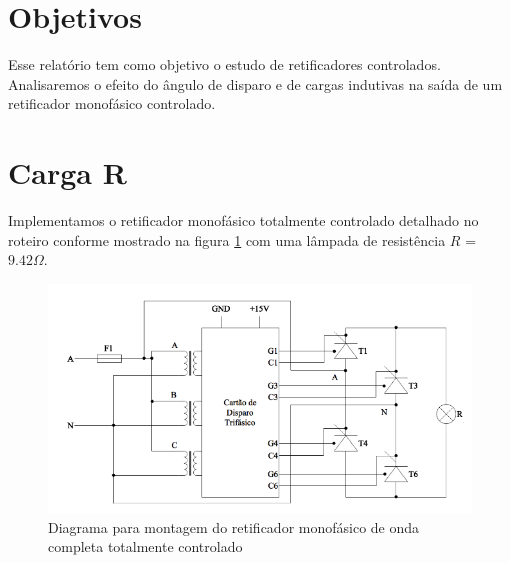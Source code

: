 \documentclass{article}
\begin{document}


\onehalfspacing
\section{Objetivos}
	Esse relatório tem como objetivo o estudo de retificadores controlados. Analisaremos o efeito do ângulo de disparo e de cargas indutivas na saída de um retificador monofásico controlado.
	 
\section{Carga R}
Implementamos o retificador monofásico totalmente controlado detalhado no roteiro conforme mostrado na figura \ref{fig:resq} com uma lâmpada de resistência $R$ = $9.42 \Omega$.
\begin{figure}[H]
	\centering
	\includegraphics[width=\linewidth]{dados/resq}
	\caption{Diagrama para montagem do retificador monofásico de onda completa totalmente controlado}
	\label{fig:resq}
\end{figure}
\end{document}
